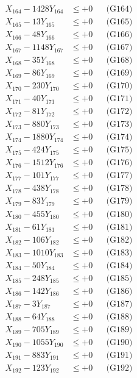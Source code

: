 \documentclass[a4paper,10pt]{article}
\begin{document}
{\begin{align}
X_{164} - 1428Y_{164} &\leq +0 && \text{(G164)} \\
X_{165} - 13Y_{165} &\leq +0 && \text{(G165)} \\
X_{166} - 48Y_{166} &\leq +0 && \text{(G166)} \\
X_{167} - 1148Y_{167} &\leq +0 && \text{(G167)} \\
X_{168} - 35Y_{168} &\leq +0 && \text{(G168)} \\
X_{169} - 86Y_{169} &\leq +0 && \text{(G169)} \\
X_{170} - 230Y_{170} &\leq +0 && \text{(G170)} \\
\allowbreak
X_{171} - 40Y_{171} &\leq +0 && \text{(G171)} \\
X_{172} - 81Y_{172} &\leq +0 && \text{(G172)} \\
X_{173} - 880Y_{173} &\leq +0 && \text{(G173)} \\
X_{174} - 1880Y_{174} &\leq +0 && \text{(G174)} \\
X_{175} - 424Y_{175} &\leq +0 && \text{(G175)} \\
X_{176} - 1512Y_{176} &\leq +0 && \text{(G176)} \\
X_{177} - 101Y_{177} &\leq +0 && \text{(G177)} \\
X_{178} - 438Y_{178} &\leq +0 && \text{(G178)} \\
X_{179} - 83Y_{179} &\leq +0 && \text{(G179)} \\
X_{180} - 455Y_{180} &\leq +0 && \text{(G180)} \\
\allowbreak
X_{181} - 61Y_{181} &\leq +0 && \text{(G181)} \\
X_{182} - 106Y_{182} &\leq +0 && \text{(G182)} \\
X_{183} - 1010Y_{183} &\leq +0 && \text{(G183)} \\
X_{184} - 50Y_{184} &\leq +0 && \text{(G184)} \\
X_{185} - 248Y_{185} &\leq +0 && \text{(G185)} \\
X_{186} - 142Y_{186} &\leq +0 && \text{(G186)} \\
X_{187} - 3Y_{187} &\leq +0 && \text{(G187)} \\
X_{188} - 64Y_{188} &\leq +0 && \text{(G188)} \\
X_{189} - 705Y_{189} &\leq +0 && \text{(G189)} \\
X_{190} - 1055Y_{190} &\leq +0 && \text{(G190)} \\
\allowbreak
X_{191} - 883Y_{191} &\leq +0 && \text{(G191)} \\
X_{192} - 123Y_{192} &\leq +0 && \text{(G192)} \\

\end{align}}
\end{document}
